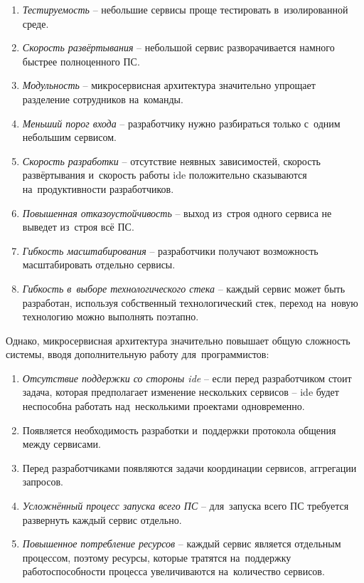 \begin{enumerate}
	\item \emph{Тестируемость} -- небольшие сервисы проще тестировать в~изолированной среде.
	\item \emph{Скорость развёртывания} -- небольшой сервис разворачивается намного быстрее полноценного ПС.
	\item \emph{Модульность} -- микросервисная архитектура значительно упрощает разделение сотрудников на~команды.
	\item \emph{Меньший порог входа} -- разработчику нужно разбираться только с~одним небольшим сервисом.
	\item \emph{Скорость разработки} -- отсутствие неявных зависимостей, скорость развёртывания и~скорость работы \gls{ide} положительно сказываются на~продуктивности разработчиков.
	\item \emph{Повышенная отказоустойчивость} -- выход из~строя одного сервиса не выведет из~строя всё ПС.
	\item \emph{Гибкость масштабирования} -- разработчики получают возможность масштабировать отдельно сервисы.
	\item \emph{Гибкость в~выборе технологического стека} -- каждый сервис может быть разработан, используя собственный технологический стек, переход на~новую технологию можно выполнять поэтапно.
\end{enumerate}

Однако, микросервисная архитектура значительно повышает общую сложность системы, вводя дополнительную работу для~программистов:

\begin{enumerate}
	\item \emph{Отсутствие поддержки со стороны \gls{ide}} -- если перед разработчиком стоит задача, которая предполагает изменение нескольких сервисов -- \gls{ide} будет неспособна работать над~несколькими проектами одновременно.
	\item Появляется необходимость разработки и~поддержки протокола общения между сервисами.
	\item Перед разработчиками появляются задачи координации сервисов, аггрегации запросов.
	\item \emph{Усложнённый процесс запуска всего ПС} -- для~запуска всего ПС требуется развернуть каждый сервис отдельно.
	\item \emph{Повышенное потребление ресурсов} -- каждый сервис является отдельным процессом, поэтому ресурсы, которые тратятся на~поддержку работоспособности процесса увеличиваются на~количество сервисов.
\end{enumerate}


